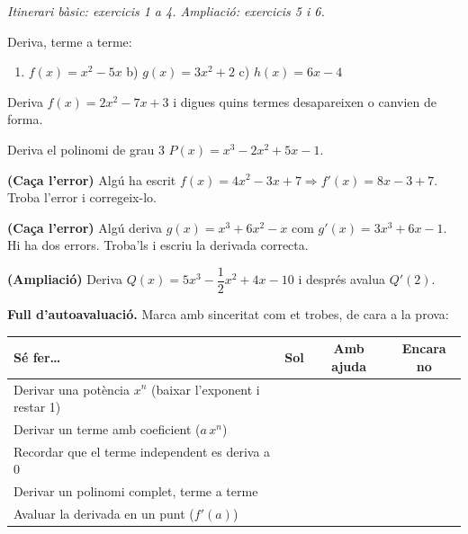 \noindent\textit{Itinerari bàsic: exercicis 1 a 4. Ampliació: exercicis 5 i 6.}

\begin{exercicis}
\begin{exlist}
  \item Deriva, terme a terme:
        \begin{enumerate}[label=\alph*), leftmargin=1.6em, topsep=2pt]
          \item $f(x)=x^2-5x$ \hfill b) $g(x)=3x^2+2$ \hfill c) $h(x)=6x-4$
        \end{enumerate}
  \item Deriva $f(x)=2x^2-7x+3$ i digues quins termes desapareixen o canvien de forma.
  \item Deriva el polinomi de grau 3 $P(x)=x^3-2x^2+5x-1$.
  \item \textbf{(Caça l'error)} Algú ha escrit
        $f(x)=4x^2-3x+7 \Rightarrow f'(x)=8x-3+7$. Troba l'error i corregeix-lo.
  \item \textbf{(Caça l'error)} Algú deriva $g(x)=x^3+6x^2-x$ com
        $g'(x)=3x^3+6x-1$. Hi ha dos errors. Troba'ls i escriu la derivada correcta.
  \item \textbf{(Ampliació)} Deriva $Q(x)=5x^3-\dfrac{1}{2}x^2+4x-10$ i després avalua
        $Q'(2)$.
\end{exlist}
\end{exercicis}

\begin{idea}
\textbf{Full d'autoavaluació.} Marca amb sinceritat com et trobes, de cara a la prova:
\begin{center}
\renewcommand{\arraystretch}{1.4}
\begin{tabular}{p{8.4cm} c c c}
\toprule
\textbf{Sé fer\dots} & \textbf{Sol} & \textbf{Amb ajuda} & \textbf{Encara no} \\
\midrule
Derivar una potència $x^n$ (baixar l'exponent i restar 1) & & & \\
Derivar un terme amb coeficient ($a\,x^n$) & & & \\
Recordar que el terme independent es deriva a $0$ & & & \\
Derivar un polinomi complet, terme a terme & & & \\
Avaluar la derivada en un punt ($f'(a)$) & & & \\
\bottomrule
\end{tabular}
\end{center}
\end{idea}

